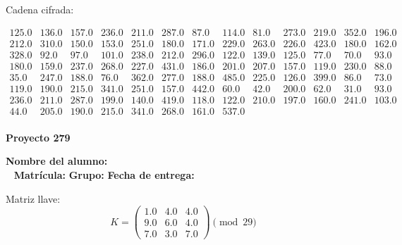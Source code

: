 \documentclass[12pt]{article}
\begin{document}
Cadena cifrada:
\begin{center}
$\begin{array}{lllllllllllll}
125.0 & 136.0 & 157.0 & 236.0 & 211.0 & 287.0 & 87.0 & 114.0 & 81.0 & 273.0 & 219.0 & 352.0 & 196.0\\
212.0 & 310.0 & 150.0 & 153.0 & 251.0 & 180.0 & 171.0 & 229.0 & 263.0 & 226.0 & 423.0 & 180.0 & 162.0\\
328.0 & 92.0 & 97.0 & 101.0 & 238.0 & 212.0 & 296.0 & 122.0 & 139.0 & 125.0 & 77.0 & 70.0 & 93.0\\
180.0 & 159.0 & 237.0 & 268.0 & 227.0 & 431.0 & 186.0 & 201.0 & 207.0 & 157.0 & 119.0 & 230.0 & 88.0\\
35.0 & 247.0 & 188.0 & 76.0 & 362.0 & 277.0 & 188.0 & 485.0 & 225.0 & 126.0 & 399.0 & 86.0 & 73.0\\
119.0 & 190.0 & 215.0 & 341.0 & 251.0 & 157.0 & 442.0 & 60.0 & 42.0 & 200.0 & 62.0 & 31.0 & 93.0\\
236.0 & 211.0 & 287.0 & 199.0 & 140.0 & 419.0 & 118.0 & 122.0 & 210.0 & 197.0 & 160.0 & 241.0 & 103.0\\
44.0 & 205.0 & 190.0 & 215.0 & 341.0 & 268.0 & 161.0 & 537.0\\
\end{array}$
\end{center}

\newpage


\textbf{Proyecto 279}

\textbf{Nombre del alumno:} \underline{\hspace{13cm}}\\\
\vspace{1cm}
\textbf{Matrícula:} \underline{\hspace{4cm}} \hspace{1cm}
\textbf{Grupo:} \underline{\hspace{2cm}}
\textbf{Fecha de entrega:} \underline{\hspace{2cm}}

\medskip

Matriz llave:
\[
K = \begin{pmatrix}
1.0 & 4.0 & 4.0\\
9.0 & 6.0 & 4.0\\
7.0 & 3.0 & 7.0
\end{pmatrix} \pmod{29}
\]
\end{document}
